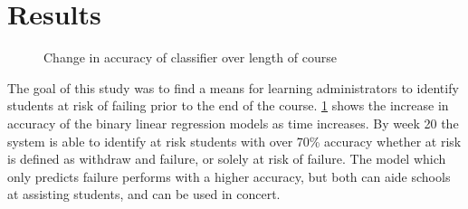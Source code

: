 \documentclass{article}
\begin{document}
\section{Results}
\begin{figure}[ht!]
	\centering
	\caption{Change in accuracy of classifier over length of course}
	\label{fig:accuracy_per_week}
\end{figure}
The goal of this study was to find a means for learning administrators to identify students at risk of failing prior to the end of the course. \ref{fig:accuracy_per_week} shows the increase in accuracy of the binary linear regression models as time increases. By week 20 the system is able to identify at risk students with over 70\% accuracy whether at risk is defined as withdraw and failure, or solely at risk of failure. The model which only predicts failure performs with a higher accuracy, but both can aide schools at assisting students, and can be used in concert.
\end{document}
